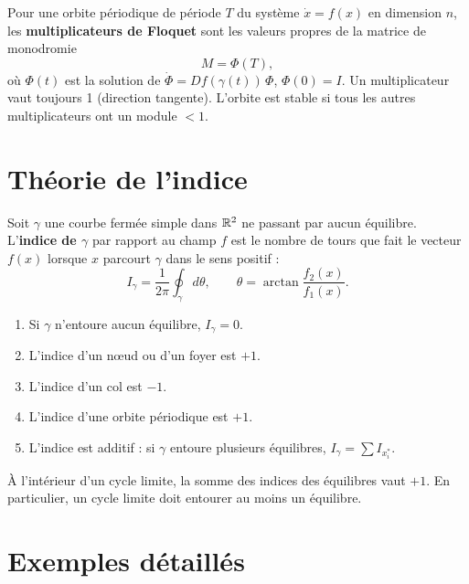 \begin{definition}
Pour une orbite p\'eriodique de p\'eriode $T$ du syst\`eme $\dot{x} = f(x)$
en dimension $n$, les \textbf{multiplicateurs de Floquet} sont les valeurs
propres de la matrice de monodromie
\[
    M = \Phi(T),
\]
o\`u $\Phi(t)$ est la solution de $\dot{\Phi} = Df(\gamma(t))\,\Phi$,
$\Phi(0) = I$. Un multiplicateur vaut toujours 1 (direction tangente).
L'orbite est stable si tous les autres multiplicateurs ont un module $< 1$.
\end{definition}

\section{Th\'eorie de l'indice}

\begin{definition}
Soit $\gamma$ une courbe ferm\'ee simple dans $\mathbb{R}^2$ ne passant par aucun
\'equilibre. L'\textbf{indice de $\gamma$} par rapport au champ $f$ est le
nombre de tours que fait le vecteur $f(x)$ lorsque $x$ parcourt $\gamma$
dans le sens positif :
\[
    I_\gamma = \frac{1}{2\pi}\oint_\gamma d\theta, \qquad
    \theta = \arctan\frac{f_2(x)}{f_1(x)}.
\]
\end{definition}

\begin{theoreme}
\begin{enumerate}
    \item Si $\gamma$ n'entoure aucun \'equilibre, $I_\gamma = 0$.
    \item L'indice d'un n\oe ud ou d'un foyer est $+1$.
    \item L'indice d'un col est $-1$.
    \item L'indice d'une orbite p\'eriodique est $+1$.
    \item L'indice est additif : si $\gamma$ entoure plusieurs \'equilibres,
    $I_\gamma = \sum I_{x_i^*}$.
\end{enumerate}
\end{theoreme}

\begin{corollaire}
\`A l'int\'erieur d'un cycle limite, la somme des indices des \'equilibres
vaut $+1$. En particulier, un cycle limite doit entourer au moins un
\'equilibre.
\end{corollaire}

\section{Exemples d\'etaill\'es}

